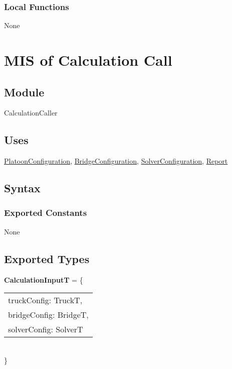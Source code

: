 \documentclass[12pt, titlepage]{article}
\begin{document}
\subsubsection{Local Functions}
None
\newpage


\section{MIS of Calculation Call} \label{CalculationCaller}

\subsection{Module}

CalculationCaller

\subsection{Uses}
\hyperref[PlatoonConfiguration]{PlatoonConfiguration}, \hyperref[BridgeConfiguration]{BridgeConfiguration}, \hyperref[SolverConfiguration]{SolverConfiguration}, \hyperref[Report]{Report}

\subsection{Syntax}

\subsubsection{Exported Constants}
None
\subsection{Exported Types}
\noindent \textbf{CalculationInputT} = \{\\
    \begin{tabular}{l}
    truckConfig: TruckT,\\
    bridgeConfig: BridgeT,\\
    solverConfig: SolverT
    \end{tabular}
\\\}
\end{document}
